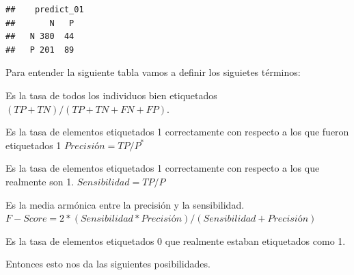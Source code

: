 \documentclass[
  12pt,
]{book}
\providecommand{\tightlist}{%
  \setlength{\itemsep}{0pt}\setlength{\parskip}{0pt}}
\theoremstyle{definition}
\theoremstyle{definition}
\theoremstyle{definition}
\theoremstyle{remark}
\begin{document}
\begin{verbatim}
##    predict_01
##       N   P
##   N 380  44
##   P 201  89
\end{verbatim}

Para entender la siguiente tabla vamos a definir los siguietes términos:

\begin{description}
\tightlist
\item[Exactitud (Accuracy)]
Es la tasa de todos los individuos bien etiquetados \((TP+TN)/(TP+TN+FN+FP)\).
\item[Precisión]
Es la tasa de elementos etiquetados 1 correctamente con respecto a los que fueron etiquetados 1 \(Precisión = TP/P^*\)
\item[Sensibilidad (Exhaustividad)]
Es la tasa de elementos etiquetados 1 correctamente con respecto a los que realmente son 1. \(Sensibilidad = TP/P\)
\item[F-Score]
Es la media armónica entre la precisión y la sensibilidad. \(F-Score = 2*(Sensibilidad * Precisión)/(Sensibilidad + Precisión)\)
\item[Especificidad]
Es la tasa de elementos etiquetados 0 que realmente estaban etiquetados como 1.
\end{description}

Entonces esto nos da las siguientes posibilidades.
\end{document}
